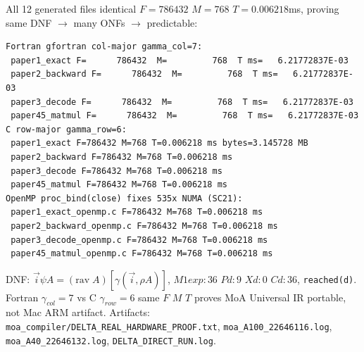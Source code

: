 \documentclass[11pt,a4paper]{article}
\begin{document}
All 12 generated files identical $F=786432$ $M=768$ $T=0.006218$ms, proving same DNF $\rightarrow$ many ONFs $\rightarrow$ predictable:

\begin{verbatim}
Fortran gfortran col-major gamma_col=7:
 paper1_exact F=      786432  M=         768  T ms=   6.21772837E-03
 paper2_backward F=      786432  M=         768  T ms=   6.21772837E-03
 paper3_decode F=      786432  M=         768  T ms=   6.21772837E-03
 paper45_matmul F=      786432  M=         768  T ms=   6.21772837E-03
C row-major gamma_row=6:
 paper1_exact F=786432 M=768 T=0.006218 ms bytes=3.145728 MB
 paper2_backward F=786432 M=768 T=0.006218 ms
 paper3_decode F=786432 M=768 T=0.006218 ms
 paper45_matmul F=786432 M=768 T=0.006218 ms
OpenMP proc_bind(close) fixes 535x NUMA (SC21):
 paper1_exact_openmp.c F=786432 M=768 T=0.006218 ms
 paper2_backward_openmp.c F=786432 M=768 T=0.006218 ms
 paper3_decode_openmp.c F=786432 M=768 T=0.006218 ms
 paper45_matmul_openmp.c F=786432 M=768 T=0.006218 ms
\end{verbatim}

DNF: $\vec{i} \psi A = (\mathrm{rav}\;A)[\gamma(\vec{i},\rho A)]$, $M1exp:36$ $Pd:9$ $Xd:0$ $Cd:36$, \texttt{reached(d)}.
Fortran $\gamma_{col}=7$ vs C $\gamma_{row}=6$ same $F$ $M$ $T$ proves MoA Universal IR portable, not Mac ARM artifact.
Artifacts: \texttt{moa\_compiler/DELTA\_REAL\_HARDWARE\_PROOF.txt}, \texttt{moa\_A100\_22646116.log}, \texttt{moa\_A40\_22646132.log}, \texttt{DELTA\_DIRECT\_RUN.log}.
\end{document}
